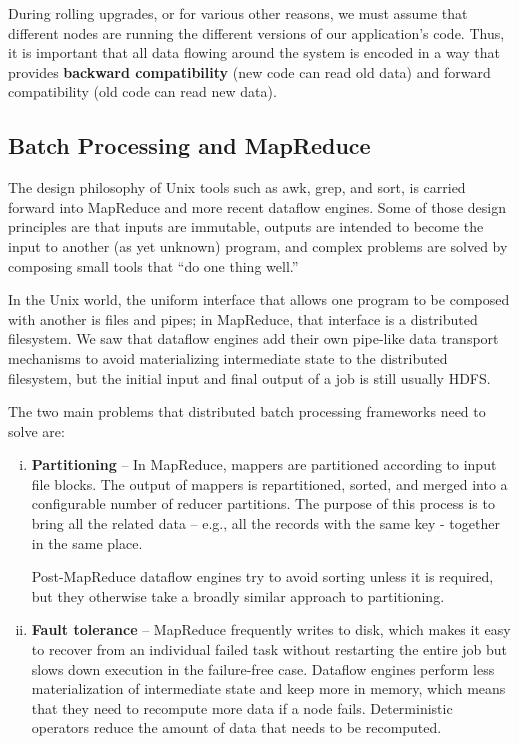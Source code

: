 \documentclass{article}
\begin{document}
    During rolling upgrades, or for various other reasons, we must assume that different nodes are running the different versions of our application’s code. Thus, it is important that all data flowing around the system is encoded in a way that provides \textbf{backward compatibility} (new code can read old data) and forward compatibility (old code can read new data).
    
    \subsection{Batch Processing and MapReduce}
     The design philosophy of Unix tools such as awk, grep, and sort, is carried forward into MapReduce and more recent dataflow engines. Some of those design principles are that inputs are immutable, outputs are intended to become the input to another (as yet unknown) program, and complex problems are solved by composing small tools that ``do one thing well.”
     
     In the Unix world, the uniform interface that allows one program to be composed with another is files and pipes; in MapReduce, that interface is a distributed filesystem. We saw that dataflow engines add their own pipe-like data transport mechanisms to avoid materializing intermediate state to the distributed filesystem, but the initial input and final output of a job is still usually HDFS.
     
    The two main problems that distributed batch processing frameworks need to solve are:
    
    \begin{enumerate}[i.]
        \item \textbf{Partitioning} -- In MapReduce, mappers are partitioned according to input file blocks. The output of mappers is repartitioned, sorted, and merged into a configurable number of reducer partitions. The purpose of this process is to bring all the related data -- e.g., all the records with the same key - together in the same place.
        
        Post-MapReduce dataflow engines try to avoid sorting unless it is required, but they otherwise take a broadly similar approach to partitioning.
        
        \item \textbf{Fault tolerance} -- MapReduce frequently writes to disk, which makes it easy to recover from an individual failed task without restarting the entire job but slows down execution in the failure-free case. Dataflow engines perform less materialization of intermediate state and keep more in memory, which means that they need to recompute more data if a node fails. Deterministic operators reduce the amount of data that needs to be recomputed.
    \end{enumerate}
    
\end{document}

